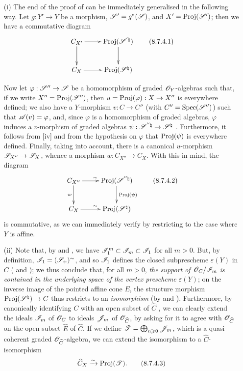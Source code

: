 \begin{remark}[8.7.4]
\label{II.8.7.4}
\begin{enumerate}
  \item[\rm{(i)}] The end of the proof of  can be immediately generalised in the following way.
    Let $g:Y'\to Y$ be a morphism, $\mathscr{S}'=g^*(\mathscr{S})$, and $X'=\operatorname{Proj}(\mathscr{S}')$;
    then we have a commutative diagram
    \[
    \label{II.8.7.4.1}
      \xymatrix{
        C_{X'}
          \ar[r]
          \ar[d]
      & \Proj(\sh{S}^{'\natural})
          \ar[d]
      \\C_X
          \ar[r]
      & \Proj(\sh{S}^\natural)
      }
    \tag{8.7.4.1}
    \]

    Now let $\varphi:\sh{S}''\to\sh{S}$ be a homomorphism of graded $\mathscr{O}_Y$-algebras such that, if we write $X''=\operatorname{Proj}(\mathscr{S}'')$, then $u=\Proj(\varphi):X\to X''$ is everywhere defined;
    we also have
    a $Y$-morphism $v:C\to C''$ (with $C''=\operatorname{Spec}(\mathscr{S}'')$) such that $\mathscr{A}(v)=\varphi$, and, since $\varphi$ is a homomorphism of graded algebras, $\varphi$ induces a $v$-morphism of graded algebras $\psi:\sh{S}^{''\natural}\to\sh{S}^\natural$ .
    Furthermore, it follows from [iv] and from the hypothesis on $\varphi$ that $\operatorname{Proj}(\psi)$ is everywhere defined.
    Finally, taking  into account, there is a canonical $u$-morphism $\sh{S}_{X''}\to\sh{S}_X$, whence  a morphism $w:C_{X''}\to C_X$.
    With this in mind, the diagram
    \[
    \label{II.8.7.4.2}
      \xymatrix{
        C_{X''}
          \ar[r]^{\sim}
          \ar[d]_{w}
      & \Proj(\sh{S}^{''\natural})
          \ar[d]^{\Proj(\psi)}
      \\C_X
          \ar[r]^{\sim}
      & \Proj(\sh{S}^\natural)
      }
    \tag{8.7.4.2}
    \]
    is commutative, as we can immediately verify by restricting to the case where $Y$ is affine.
  \item[\rm{(ii)}] Note that, by  and , we have $\mathscr{I}_1^m\subset\mathscr{I}_m\subset\mathscr{I}_1$ for all $m>0$.
    But, by definition, $\mathscr{I}_1=(\mathscr{S}_+)^\sim$, and so $\mathscr{I}_1$ defines the closed subprescheme $\varepsilon(Y)$ in $C$ ( and );
    we thus conclude that, for all $m>0$, \emph{the support of $\mathscr{O}_C/\mathscr{I}_m$ is contained in the underlying space of the vertex prescheme $\varepsilon(Y)$};
    on the inverse image of the pointed affine cone $E$, the structure morphism $\Proj(\sh{S}^\natural)\to C$ thus restricts to an \emph{isomorphism} (by  and ).
    Furthermore, by canonically identifying $C$ with an open subset of $\widehat{C}$ , we can clearly extend the ideals $\mathscr{I}_m$ of $\mathscr{O}_C$ to ideals $\mathscr{J}_m$ of $\mathscr{O}_{\widehat{C}}$, by asking for it to agree with $\mathscr{O}_{\widehat{C}}$ on the open subset $\widehat{E}$ of $\widehat{C}$.
    If we define $\mathscr{T}=\bigoplus_{n\geqslant0}\mathscr{J}_m$, which is a quasi-coherent graded $\mathscr{O}_{\widehat{C}}$-algebra, we can extend the isomorphism  to a $\widehat{C}$-isomorphism
    \[
    \label{II.8.7.4.3}
      \widehat{C}_X \xrightarrow{\sim} \operatorname{Proj}(\mathscr{T}).
    \tag{8.7.4.3}
    \]


\end{enumerate}
\end{remark}
